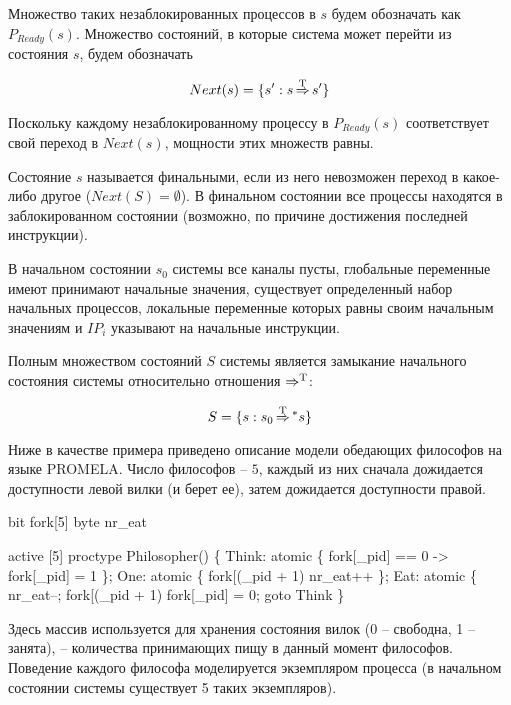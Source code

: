 Множество таких незаблокированных процессов в $s$ будем обозначать как $P_{Ready}(s)$.
Множество состояний, в которые система может перейти из состояния $s$, будем обозначать

\begin{equation}
  \label{eq:next-def}
  Next(s) = \{ s': s \operatorname{\operatorname*{\Rightarrow}^T} s' \}
\end{equation}

Поскольку каждому незаблокированному процессу в $P_{Ready}(s)$ соответствует свой переход
в $Next(s)$, мощности этих множеств равны.

Состояние $s$ называется финальными, если из него невозможен переход в
какое-либо другое ($Next(S) = \emptyset$). В финальном состоянии все
процессы находятся в заблокированном состоянии (возможно, по причине
достижения последней инструкции).

В начальном состоянии $s_0$ системы все каналы пусты, глобальные переменные
имеют принимают начальные значения, существует определенный набор
начальных процессов, локальные переменные которых равны своим
начальным значениям и $IP_i$ указывают на начальные инструкции. 

Полным множеством состояний $S$ системы является замыкание начального
состояния системы относительно отношения $\operatorname{\operatorname*{\Rightarrow}^T}$:

\begin{equation}
  \label{eq:statespace-def}
  S = \{s: s_0 \operatorname{\operatorname*{\Rightarrow}^T} \mbox{}^* s\}
\end{equation}

Ниже в качестве примера приведено описание модели обедающих философов
на языке PROMELA. Число философов -- $5$, каждый из них сначала
дожидается доступности левой вилки (и берет ее), затем дожидается
доступности правой.

\label{code:philo}

\begin{CodeBlock}
bit  fork[5]
byte nr_eat

active [5] proctype Philosopher() \{
Think:
  atomic \{ fork[_pid] == 0 -> fork[_pid] = 1 \};
One:
  atomic \{ fork[(_pid + 1)%
           nr_eat++ \};
Eat:
  atomic \{ nr_eat--; fork[(_pid + 1)%
  fork[_pid] = 0;
  goto Think
\}  
\end{CodeBlock}

Здесь массив  используется для хранения состояния вилок (0
-- свободна, 1 -- занята),  -- количества принимающих
пищу в данный момент философов. Поведение каждого философа
моделируется экземпляром процесса  (в начальном
состоянии системы существует 5 таких экземпляров).

